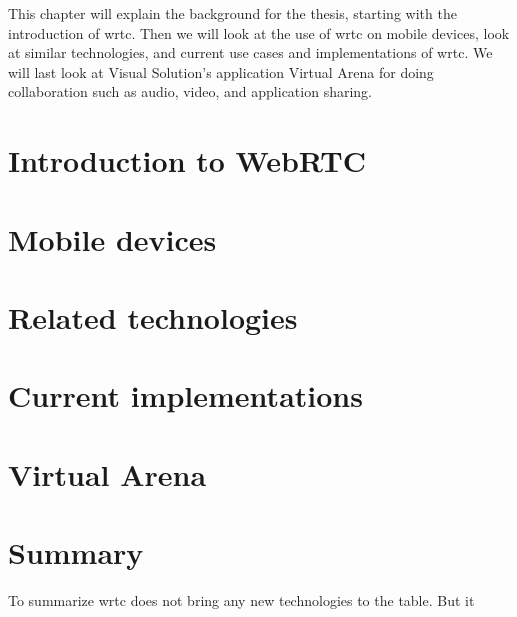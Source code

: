 
This chapter will explain the background for the thesis, starting with the introduction of \gls{wrtc}. Then we will look at the use of \gls{wrtc} on mobile devices, look at similar technologies, and current use cases and implementations of \gls{wrtc}. We will last look at Visual Solution's application Virtual Arena for doing collaboration such as audio, video, and application sharing.

\section{Introduction to WebRTC}


\newpage
\section{Mobile devices}


\newpage
\section{Related technologies}


\newpage
\section{Current implementations}


\newpage
\section{Virtual Arena}


\newpage
\section{Summary}
To summarize \gls{wrtc} does not bring any new technologies to the table. But it